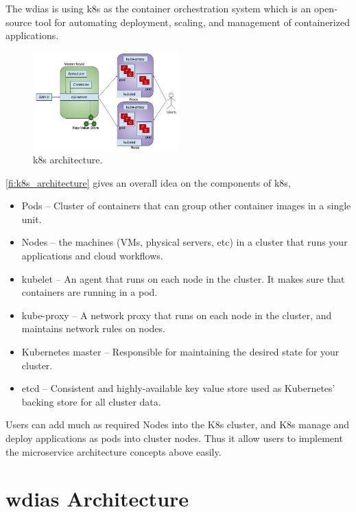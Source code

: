 \documentclass[conference]{IEEEtran}
\begin{document}
The \acrshort{wdias} is using \acrfull{k8s} as the container orchestration system which is an open-source tool for automating deployment, scaling, and management of containerized applications.

\begin{figure}[htbp]
\centerline{\includegraphics[width=0.5\textwidth]{method/microservice/k8s_architecture_v3.jpg}}
\caption{\acrfull{k8s} architecture.}
\label{pfi:k8s_architecture}
\end{figure}

\cref{fi:k8s_architecture} gives an overall idea on the components of \acrshort{k8s},
\begin{itemize}
    \item Pods -- Cluster of containers that can group other container images in a single unit.
    \item Nodes -- the machines (VMs, physical servers, etc) in a cluster that runs your applications and cloud workflows.
    \item kubelet -- An agent that runs on each node in the cluster. It makes sure that containers are running in a pod.
    \item kube-proxy -- A network proxy that runs on each node in the cluster, and maintains network rules on nodes.
    \item Kubernetes master -- Responsible for maintaining the desired state for your cluster.
    \item etcd -- Consistent and highly-available key value store used as Kubernetes’ backing store for all cluster data.
\end{itemize}
Users can add much as required Nodes into the K8s cluster, and K8s manage and
deploy applications as pods into cluster nodes. Thus it allow users to implement the microservice architecture concepts above easily.

\section{\acrfull{wdias} Architecture}
\label{pse:wdias_architecture}
\end{document}
